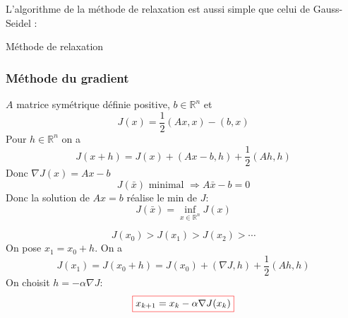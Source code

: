 \documentclass{beamer}
\newcommand{\myredbox}[1]{\fcolorbox{red}{white}{$\displaystyle#1$}}
\newenvironment{algo}{
\begin{algorithm}[H]
\DontPrintSemicolon \SetAlgoVlined}
{\end{algorithm}}
\begin{document}
\begin{frame}
L'algorithme de la méthode de relaxation est aussi simple que celui de Gauss-Seidel :

\begin{algo}
\caption{Méthode de relaxation}
\end{algo}
\end{frame}

\begin{frame}
\frametitle{Méthode du gradient}
$A$ matrice symétrique définie positive, $b\in \mathbb{R}^n$ et
\[J(x)=\frac 12(Ax,x)-(b,x)\]
Pour $h\in\mathbb{R}^n$ on a
\[J(x+h)=J(x)+(Ax-b,h)+\frac 12(Ah,h)\]
Donc $\nabla J(x)= Ax-b$ 
\[J(\bar{x})\mbox{ minimal } \Longrightarrow A\bar{x}-b=0\]
Donc la solution de $Ax=b$ réalise le min de $J$:
\[J(\bar{x})=\inf_{x\in\mathbb{R}^n}J(x)\]


\end{frame}

\begin{frame}
\begin{center}
 \end{center}
 
 \[J(x_0)>J(x_1)>J(x_2)>\cdots\]
 On pose $x_1=x_0+h$. On a
\[J(x_1)=J(x_0+h)=J(x_0)+(\nabla J,h)+\frac 12(Ah,h)\]
On choisit $h=-\alpha \nabla J$:
\[\myredbox{x_{k+1}=x_k-\alpha \nabla J(x_k)}\]
\end{frame}
\end{document}
